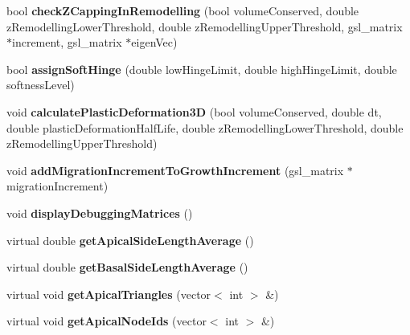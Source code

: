 \begin{DoxyCompactItemize}
\item 
\hypertarget{classShapeBase_a2e7fdc8e749b8b709b6c80248dc2bc3f}{}bool {\bfseries check\+Z\+Capping\+In\+Remodelling} (bool volume\+Conserved, double z\+Remodelling\+Lower\+Threshold, double z\+Remodelling\+Upper\+Threshold, gsl\+\_\+matrix $\ast$increment, gsl\+\_\+matrix $\ast$eigen\+Vec)\label{classShapeBase_a2e7fdc8e749b8b709b6c80248dc2bc3f}

\item 
\hypertarget{classShapeBase_ab533629d46c9c4c61d51ca74b3f8cd63}{}bool {\bfseries assign\+Soft\+Hinge} (double low\+Hinge\+Limit, double high\+Hinge\+Limit, double softness\+Level)\label{classShapeBase_ab533629d46c9c4c61d51ca74b3f8cd63}

\item 
\hypertarget{classShapeBase_aa1c9eda4ef1eb0b23620235039bab921}{}void {\bfseries calculate\+Plastic\+Deformation3\+D} (bool volume\+Conserved, double dt, double plastic\+Deformation\+Half\+Life, double z\+Remodelling\+Lower\+Threshold, double z\+Remodelling\+Upper\+Threshold)\label{classShapeBase_aa1c9eda4ef1eb0b23620235039bab921}

\item 
\hypertarget{classShapeBase_a4209349f115394a765fd969f5166bb4b}{}void {\bfseries add\+Migration\+Increment\+To\+Growth\+Increment} (gsl\+\_\+matrix $\ast$migration\+Increment)\label{classShapeBase_a4209349f115394a765fd969f5166bb4b}

\item 
\hypertarget{classShapeBase_ac9a9f16148650a7acce1ec74aa693930}{}void {\bfseries display\+Debugging\+Matrices} ()\label{classShapeBase_ac9a9f16148650a7acce1ec74aa693930}

\item 
\hypertarget{classShapeBase_a6d8088a8bb897d79a796a253c06d954f}{}virtual double {\bfseries get\+Apical\+Side\+Length\+Average} ()\label{classShapeBase_a6d8088a8bb897d79a796a253c06d954f}

\item 
\hypertarget{classShapeBase_a050c5dc5cd30c29e79533a367723b936}{}virtual double {\bfseries get\+Basal\+Side\+Length\+Average} ()\label{classShapeBase_a050c5dc5cd30c29e79533a367723b936}

\item 
\hypertarget{classShapeBase_a15fc4de860f3ed4ae05310b655f21836}{}virtual void {\bfseries get\+Apical\+Triangles} (vector$<$ int $>$ \&)\label{classShapeBase_a15fc4de860f3ed4ae05310b655f21836}

\item 
\hypertarget{classShapeBase_a161a3c9f10785b04f830c7f96e7d1d6f}{}virtual void {\bfseries get\+Apical\+Node\+Ids} (vector$<$ int $>$ \&)\label{classShapeBase_a161a3c9f10785b04f830c7f96e7d1d6f}


\end{DoxyCompactItemize}
